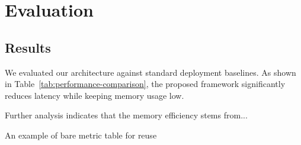 \chapter{Evaluation}
\label{ch:evaluation}

\section{Results}
We evaluated our architecture against standard deployment baselines. 
As shown in Table~\ref{tab:performance-comparison}, the proposed framework 
significantly reduces latency while keeping memory usage low.



Further analysis indicates that the memory efficiency stems from...

An example of bare metric table for reuse

\begin{table}[htbp]
    \centering
    \caption{Model evaluation metrics.}
    \label{tab:metrics}
    
\end{table}